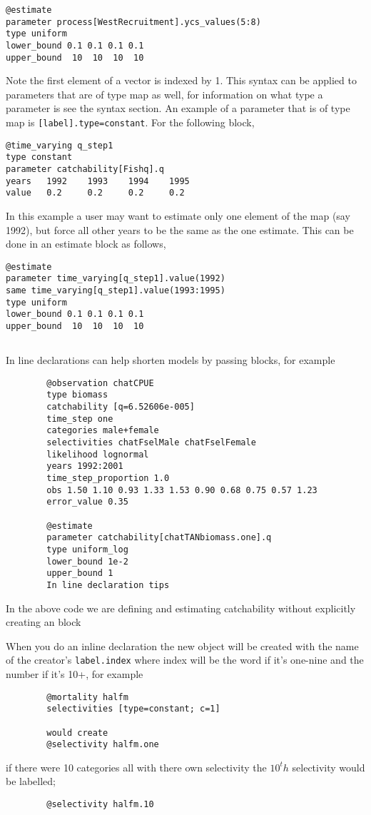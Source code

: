 {\small{\begin{verbatim}
@estimate
parameter process[WestRecruitment].ycs_values(5:8)
type uniform
lower_bound 0.1 0.1 0.1 0.1
upper_bound  10  10  10  10 
\end{verbatim}}}

Note the first element of a vector is indexed by 1. This syntax can be applied to parameters that are of type map as well, for information on what type a parameter is see the syntax section. An example of a parameter that is of type map is \texttt{[label].type=constant}. For the following  block,

{\small{\begin{verbatim}
@time_varying q_step1
type constant
parameter catchability[Fishq].q
years 	1992	1993	1994	1995
value 	0.2		0.2		0.2		0.2	
\end{verbatim}}}

In this example a user may want to estimate only one element of the map (say 1992), but force all other years to be the same as the one estimate. This can be done in an estimate block as follows,
{\small{\begin{verbatim}
@estimate
parameter time_varying[q_step1].value(1992)
same time_varying[q_step1].value(1993:1995)
type uniform
lower_bound 0.1 0.1 0.1 0.1
upper_bound  10  10  10  10 
\end{verbatim}}}
\subsection{\label{sec:declare}}
In line declarations can help shorten models by passing \command{} blocks, for example 
{\small{\begin{verbatim}
		@observation chatCPUE
		type biomass
		catchability [q=6.52606e-005]
		time_step one
		categories male+female
		selectivities chatFselMale chatFselFemale
		likelihood lognormal
		years 1992:2001
		time_step_proportion 1.0
		obs 1.50 1.10 0.93 1.33 1.53 0.90 0.68 0.75 0.57 1.23
		error_value 0.35
		
		@estimate 
		parameter catchability[chatTANbiomass.one].q
		type uniform_log
		lower_bound 1e-2
		upper_bound 1
		In line declaration tips
		\end{verbatim}}}

In the above code we are defining and estimating catchability without explicitly creating an  block


When you do an inline declaration the new object will be created with the name of the creator's \texttt{label.index}
where index will be the word if it's one-nine and the number if it's 10+, for example
{\small{\begin{verbatim}
		@mortality halfm
		selectivities [type=constant; c=1]
		
		would create
		@selectivity halfm.one
		\end{verbatim}}}

if there were 10 categories all with there own selectivity the $10^th$ selectivity would be labelled;

{\small{\begin{verbatim}
		@selectivity halfm.10
		\end{verbatim}}}
